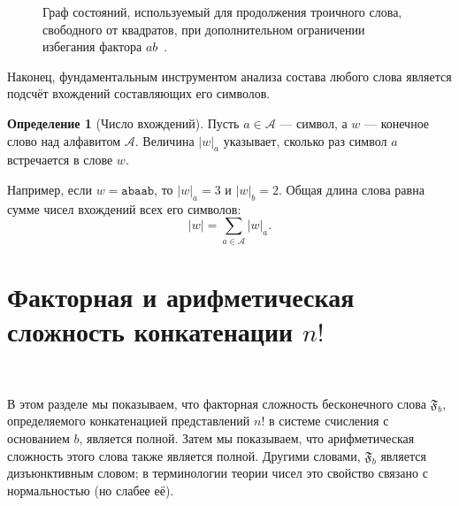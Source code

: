 \documentclass[a4paper,14pt]{extreport}
\theoremstyle{plain}
\theoremstyle{definition}
\newtheorem{definition}{Определение}[section]
\theoremstyle{remark}
\begin{document}
\begin{figure}[ht!]
	\caption{Граф состояний, используемый для продолжения троичного слова, свободного от квадратов, при дополнительном ограничении избегания фактора $ab$~\cite{Zolotov}.}
	\label{fig:zolotov_extension}
\end{figure}

Наконец, фундаментальным инструментом анализа состава любого слова является подсчёт вхождений составляющих его символов.

\begin{definition}[Число вхождений]
	Пусть $a \in \mathcal{A}$ --- символ, а $w$ --- конечное слово над алфавитом $\mathcal{A}$. Величина $|w|_a$ указывает, сколько раз символ $a$ встречается в слове $w$.
\end{definition}

Например, если $w = \texttt{abaab}$, то $|w|_a = 3$ и $|w|_b = 2$. Общая длина слова равна сумме чисел вхождений всех его символов:
\begin{equation}
	|w| = \sum_{a \in \mathcal{A}} |w|_a.
\end{equation}
\section{Факторная и арифметическая сложность конкатенации \texorpdfstring{$n!$}{n!}}~\label{sec2.2}

В этом разделе мы показываем, что факторная сложность бесконечного слова $\mathfrak{F}_{b}$, определяемого конкатенацией представлений $n!$ в системе счисления с основанием $b$, является полной. Затем мы показываем, что арифметическая сложность этого слова также является полной. Другими словами, $\mathfrak{F}_{b}$ является дизъюнктивным словом; в терминологии теории чисел это свойство связано с нормальностью (но слабее её).
\end{document}
